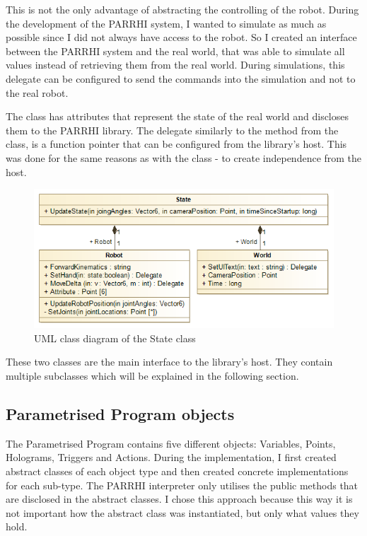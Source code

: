 This is not the only advantage of abstracting the controlling of the robot. During the development of the PARRHI system, I wanted to simulate as much as possible since I did not always have access to the robot. So I created an interface between the PARRHI system and the real world, that was able to simulate all values instead of retrieving them from the real world. During simulations, this delegate can be configured to send the commands into the simulation and not to the real robot.  

The  class has attributes that represent the state of the real world and discloses them to the PARRHI library. The  delegate similarly to the  method from the  class, is a function pointer that can be configured from the library's host. This was done for the same reasons as with the  class - to create independence from the host.

\begin{figure}[!h]
	\centering
	\includegraphics[width=0.7\linewidth]{Figures/Implementation_State}
	\caption[UML class diagram of the State class]{UML class diagram of the State class}
	\label{Fig:ImplementationState}
\end{figure}

These two classes are the main interface to the library's host. They contain multiple subclasses which will be explained in the following section.

\subsection{Parametrised Program objects}
The Parametrised Program contains five different objects: Variables, Points, Holograms, Triggers and Actions. During the implementation, I first created abstract classes of each object type and then created concrete implementations for each sub-type. The PARRHI interpreter only utilises the public methods that are disclosed in the abstract classes. I chose this approach because this way it is not important how the abstract class was instantiated, but only what values they hold.

